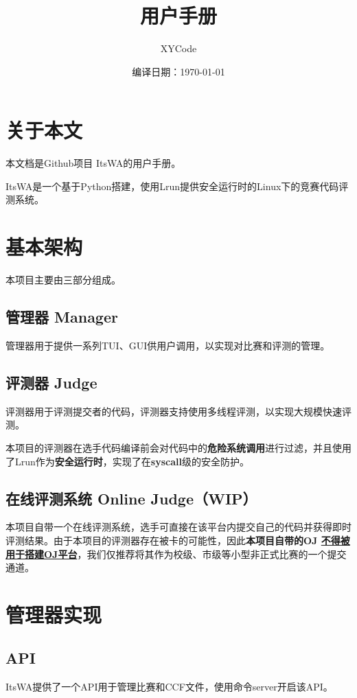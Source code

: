 \documentclass[UTF8]{ctexart}
\title{\textbf{\itswa 用户手册}}
\author{XYCode}
\date{编译日期：\today}
\newcommand{\itswa}{ItsWA}
\begin{document}
    \maketitle

    \tableofcontents
    \clearpage

    \section*{关于本文}
        本文档是Github项目 \itswa 的用户手册。

        \itswa 是一个基于Python搭建，使用Lrun提供安全运行时的Linux下的竞赛代码评测系统。
    
    \section{基本架构}
        本项目主要由三部分组成。

        \subsection{管理器 Manager}
            管理器用于提供一系列TUI、GUI供用户调用，以实现对比赛和评测的管理。

        \subsection{评测器 Judge}
            评测器用于评测提交者的代码，评测器支持使用多线程评测，以实现大规模快速评测。

            本项目的评测器在选手代码编译前会对代码中的\textbf{危险系统调用}进行过滤，并且使用了Lrun作为\textbf{安全运行时}，实现了在\textbf{syscall}级的安全防护。

        \subsection{在线评测系统 Online Judge（WIP）}
            本项目自带一个在线评测系统，选手可直接在该平台内提交自己的代码并获得即时评测结果。由于本项目的评测器存在被卡的可能性，因此\textbf{本项目自带的OJ \uline{不得被用于搭建OJ平台}}，我们仅推荐将其作为校级、市级等小型非正式比赛的一个提交通道。

    \section{管理器实现}
        \subsection{API}
            \itswa 提供了一个API用于管理比赛和CCF文件，使用命令server开启该API。
\end{document}
